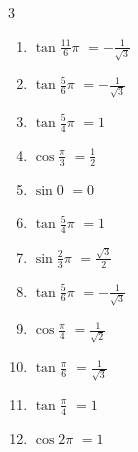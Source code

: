 \begin{multicols}{3}
\begin{enumerate}
  \item $\displaystyle \tan{\frac{11}{6}\pi}$
        $\displaystyle =-\frac{1}{\sqrt{3}}$

  \item $\displaystyle \tan{\frac{5}{6}\pi}$
        $\displaystyle =-\frac{1}{\sqrt{3}}$

  \item $\displaystyle \tan{\frac{5}{4}\pi}$
        $\displaystyle =1$

  \item $\displaystyle \cos{\frac{\pi}{3}}$
        $\displaystyle =\frac{1}{2}$

  \item $\displaystyle \sin{0}$
        $\displaystyle =0$

  \item $\displaystyle \tan{\frac{5}{4}\pi}$
        $\displaystyle =1$

  \item $\displaystyle \sin{\frac{2}{3}\pi}$
        $\displaystyle =\frac{\sqrt{3}}{2}$

  \item $\displaystyle \tan{\frac{5}{6}\pi}$
        $\displaystyle =-\frac{1}{\sqrt{3}}$

  \item $\displaystyle \cos{\frac{\pi}{4}}$
        $\displaystyle =\frac{1}{\sqrt{2}}$

  \item $\displaystyle \tan{\frac{\pi}{6}}$
        $\displaystyle =\frac{1}{\sqrt{3}}$

  \item $\displaystyle \tan{\frac{\pi}{4}}$
        $\displaystyle =1$

  \item $\displaystyle \cos{2\pi}$
        $\displaystyle =1$

\end{enumerate}
\end{multicols}
